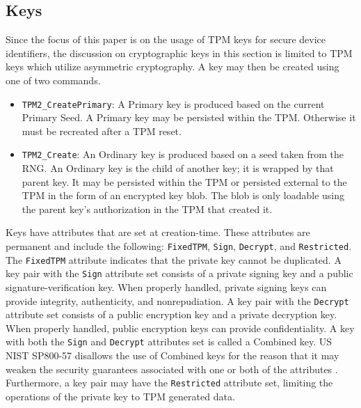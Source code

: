\subsection{Keys}



Since the focus of this paper is on the usage of TPM keys for secure device identifiers, the discussion on cryptographic keys in this section is limited to TPM keys which utilize asymmetric cryptography.  A key may then be created using one of two commands.
\begin{itemize}
  \item \verb|TPM2_CreatePrimary|: A Primary key is produced based on the current Primary Seed. A Primary key may be persisted within the TPM. Otherwise it must be recreated after a TPM reset.
  \item \verb|TPM2_Create|: An Ordinary key is produced based on a seed taken from the RNG. An Ordinary key is the child of another key; it is wrapped by that parent key. It may be persisted within the TPM or persisted external to the TPM in the form of an encrypted key blob. The blob is only loadable using the parent key's authorization in the TPM that created it.
\end{itemize}
Keys have attributes that are set at creation-time. These attributes are permanent and include the following: \verb|FixedTPM|, \verb|Sign|, \verb|Decrypt|, and \verb|Restricted|. The \verb|FixedTPM| attribute indicates that the private key cannot be duplicated. A key pair with the \verb|Sign| attribute set consists of a private signing key and a public signature-verification key. When properly handled, private signing keys can provide integrity, authenticity, and nonrepudiation. A key pair with the \verb|Decrypt| attribute set consists of a public encryption key and a private decryption key. When properly handled, public encryption keys can provide confidentiality. A key with both the \verb|Sign| and \verb|Decrypt| attributes set is called a Combined key. US NIST SP800-57 disallows the use of Combined keys for the reason that it may weaken the security guarantees associated with one or both of the attributes \cite{KeyManagement}. Furthermore, a key pair may have the \verb|Restricted| attribute set, limiting the operations of the private key to TPM generated data.

